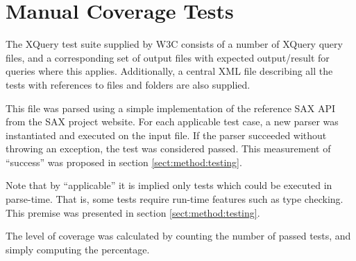 \section{Manual Coverage Tests}
\label{sect:implementation:manualCoverage}
The XQuery test suite supplied by W3C\cite{w3c05} consists of a number of
XQuery query files, and a corresponding set of output files with expected
output/result for queries where this applies. Additionally, a central XML file
describing all the tests with references to files and folders are also supplied.

This file was parsed using a simple implementation of the reference SAX API
from the SAX project website\cite{saxproject}. For each applicable
test case, a new parser was instantiated and executed on the input file. If the
parser succeeded without throwing an exception, the test was considered passed.
This measurement of ``success'' was proposed in section \ref{sect:method:testing}.

Note that by ``applicable'' it is implied only tests which could be executed in
parse-time. That is, some tests require run-time features such as type
checking. This premise was presented in section \ref{sect:method:testing}.

The level of coverage was calculated by counting the number of passed tests, and
simply computing the percentage.